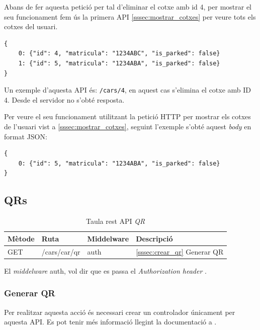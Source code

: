 Abans de fer aquesta petició per tal d'eliminar el cotxe amb id 4, per mostrar el seu funcionament
fem ús la primera API \autoref{sssec:mostrar_cotxes} per veure tots els cotxes del usuari.
\begin{verbatim}
{
    0: {"id": 4, "matricula": "1234ABC", "is_parked": false}
    1: {"id": 5, "matricula": "1234ABA", "is_parked": false}
}
\end{verbatim}

Un exemple d'aquesta API és: \texttt{/cars/4}, en aquest cas s'elimina el cotxe amb ID 4.
Desde el servidor no s'obté resposta.

Per veure el seu funcionament utilitzant la petició HTTP per mostrar els cotxes de l'usuari
vist a  \autoref{sssec:mostrar_cotxes}, seguint l'exemple s'obté aquest \emph{body} en format JSON:
\begin{verbatim}
{
    0: {"id": 5, "matricula": "1234ABA", "is_parked": false}
}
\end{verbatim}

\subsection{QRs}


\begin{table}[H]
\centering
\begin{tabular}{llll}
\hline
\textbf{Mètode} & \textbf{Ruta} & \textbf{Middelware} & \textbf{Descripció} \\ \hline
GET             & /cars/{car}/qr   &  auth  &  \autoref{sssec:crear_qr}{ Generar QR}     \\ \hline
\end{tabular}
\caption{Taula rest API \emph{QR}}
\label{tab:my-QR-api-table}
\end{table}

El \emph{middelware} auth, vol dir que es passa el \emph{Authorization header} \autocite{middleware_laravel}.

\subsubsection{Generar QR}
\label{sssec:crear_qr}

Per realitzar aquesta acció és necessari crear un controlador
únicament per aquesta API. Es pot tenir més informació llegint la documentació a \autocite{lar_single_action_controllers}.

